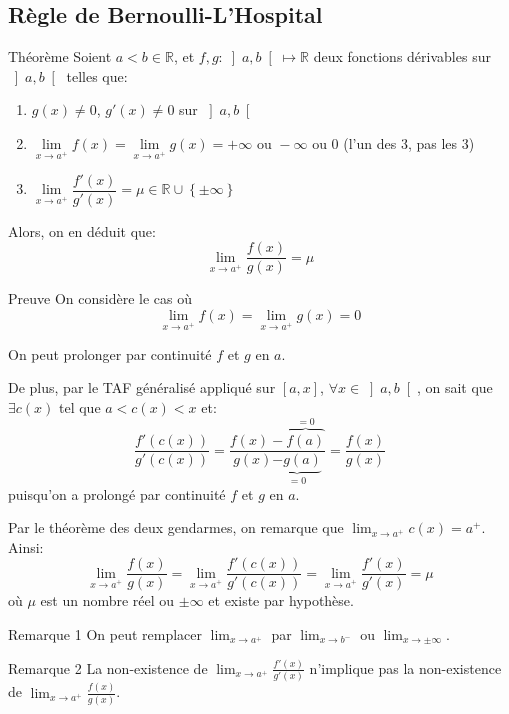 \documentclass[a4paper]{article}
\begin{document}
\subsection{Règle de Bernoulli-L'Hospital}
\begin{parag}{Théorème}
    Soient $a < b \in \mathbb{R}$, et $f, g : \left]a, b\right[ \mapsto \mathbb{R} $ deux fonctions dérivables sur $\left]a, b\right[ $ telles que:
    \begin{enumerate}
        \item $g\left(x\right) \neq 0$, $g'\left(x\right) \neq 0$ sur $\left]a, b\right[ $
        \item $\lim\limits_{x \to a^+} f\left(x\right) = \lim\limits_{x \to a^+} g\left(x\right) = +\infty \text{ ou } -\infty \text{ ou } 0$ (l'un des 3, pas les 3)
        \item $\lim\limits_{x \to a^+} \dfrac{f'\left(x\right)}{g'\left(x\right)} = \mu \in \mathbb{R} \cup \left\{\pm \infty\right\}$
    \end{enumerate}

    Alors, on en déduit que: 
    \[\lim_{x \to a^+}  \frac{f\left(x\right)}{g\left(x\right)} = \mu\]
    
    \begin{subparag}{Preuve}
        On considère le cas où 
        \[\lim_{x \to a^+} f\left(x\right) = \lim_{x \to a^+} g\left(x\right) = 0\]
        
        On peut prolonger par continuité $f$ et $g$ en $a$.

        De plus, par le TAF généralisé appliqué sur $\left[a, x\right] $, $\forall x \in \left]a, b\right[ $, on sait que $\exists c\left(x\right)$ tel que $a < c\left(x\right) < x$ et: 
        \[\frac{f'\left(c\left(x\right)\right)}{g'\left(c\left(x\right)\right)} = \frac{f\left(x\right) - \overbrace{f\left(a\right)}^{= 0}}{g\left(x\right) \underbrace{- g\left(a\right)}_{= 0}} = \frac{f\left(x\right)}{g\left(x\right)}\]
        puisqu'on a prolongé par continuité $f$ et $g$ en $a$.
        
        Par le théorème des deux gendarmes, on remarque que $\lim_{x \to a^+} c\left(x\right) = a^+$. Ainsi: 
        \[\lim_{x \to a^+} \frac{f\left(x\right)}{g\left(x\right)} = \lim_{x \to a^+} \frac{f'\left(c\left(x\right)\right)}{g'\left(c\left(x\right)\right)} = \lim_{x \to a^+} \frac{f'\left(x\right)}{g'\left(x\right)} = \mu\]
        où $\mu$ est un nombre réel ou $\pm \infty$ et existe par hypothèse.
    \end{subparag}

    \begin{subparag}{Remarque 1}
        On peut remplacer $\lim_{x \to a^+} $ par $\lim_{x \to b^-} $ ou $\lim_{x \to \pm \infty} $.
    \end{subparag}

    \begin{subparag}{Remarque 2}
        La non-existence de $\lim_{x \to a^+} \frac{f'\left(x\right)}{g'\left(x\right)}$ n'implique pas la non-existence de $\lim_{x \to a^+} \frac{f\left(x\right)}{g\left(x\right)}$.
    \end{subparag}
    
\end{parag}
\end{document}
